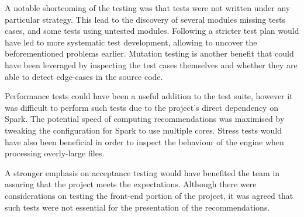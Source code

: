\documentclass{l3proj}
\begin{document}
A notable shortcoming of the testing was that tests were not written under any particular strategy. This lead to the discovery of several modules missing tests cases, and some tests using untested modules. Following a stricter test plan would have led to more systematic test development, allowing to uncover the beforementioned problems earlier. Mutation testing is another benefit that could have been leveraged by inspecting the test cases themselves and whether they are able to detect edge-cases in the source code.

Performance tests could have been a useful addition to the test suite, however it was difficult to perform such tests due to the project's direct dependency on Spark. The potential speed of computing recommendations was maximised by tweaking the configuration for Spark to use multiple cores. Stress tests would have also been beneficial in order to inspect the behaviour of the engine when processing overly-large files.

A stronger emphasis on acceptance testing would have benefited the team in assuring that the project meets the expectations. Although there were considerations on testing the front-end portion of the project, it was agreed that such tests were not essential for the presentation of the recommendations.

%
%
\end{document}
